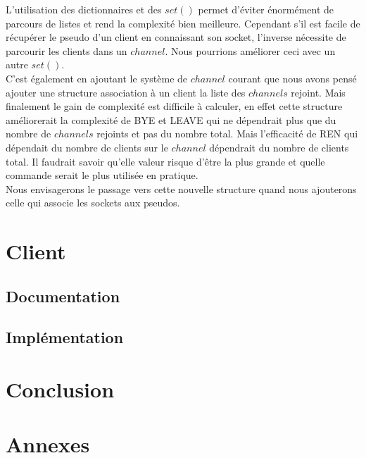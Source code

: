 \documentclass[12pt]{article}
\begin{document}
L'utilisation des dictionnaires et des $set()$ permet d'éviter énormément de parcours
de listes et rend la complexité bien meilleure. Cependant s'il est facile de récupérer le
pseudo d'un client en connaissant son socket, l'inverse nécessite de parcourir les clients
dans un $channel$. Nous pourrions améliorer ceci avec un autre $set()$.
\\C'est également en ajoutant le système de $channel$ courant que nous avons pensé ajouter
une structure association à un client la liste des $channels$ rejoint. Mais finalement le
gain de complexité est difficile à calculer, en effet cette structure améliorerait la complexité
de BYE et LEAVE qui ne dépendrait plus que du nombre de $channels$ rejoints et pas du nombre total.
Mais l'efficacité de REN qui dépendait du nombre de clients sur le $channel$ dépendrait du nombre de clients
total. Il faudrait savoir qu'elle valeur risque d'être la plus grande et quelle commande serait
le plus utilisée en pratique.
\\Nous envisagerons le passage vers cette nouvelle structure quand nous ajouterons celle qui
associe les sockets aux pseudos.
\\


\section{Client}

\subsection{Documentation}

\subsection{Implémentation}



\section{Conclusion}




\section{Annexes}
\end{document}
